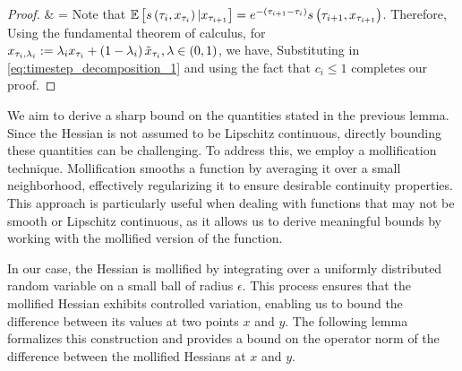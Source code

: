 \begin{proof}
{    & = 
    }
    Note that $\mathbb{E}\left[s\left(\tau_{i}, x_{\tau_i}\right)|x_{\tau_{i+1}}\right] = e^{-\left(\tau_{i+1}-\tau_{i}\right)}s\left(\tau_{i+1}, x_{\tau_{i+1}}\right)$. Therefore, 
    Using the fundamental theorem of calculus, for $x_{\tau_{i},\lambda_{i}} := \lambda_{i}x_{\tau_{i}} + \left(1-\lambda_{i}\right) \tilde{x}_{\tau_{i}}, \lambda \in \left(0,1\right)$, we have, 
    Substituting in \eqref{eq:timestep_decomposition_1} and using the fact that $c_i \leq 1$ completes our proof.
\end{proof}

We aim to derive a sharp bound on the quantities stated in the previous lemma. Since the Hessian is not assumed to be Lipschitz continuous, directly bounding these quantities can be challenging. To address this, we employ a mollification technique. Mollification smooths a function by averaging it over a small neighborhood, effectively regularizing it to ensure desirable continuity properties. This approach is particularly useful when dealing with functions that may not be smooth or Lipschitz continuous, as it allows us to derive meaningful bounds by working with the mollified version of the function.

In our case, the Hessian is mollified by integrating over a uniformly distributed random variable on a small ball of radius \(\epsilon\). This process ensures that the mollified Hessian exhibits controlled variation, enabling us to bound the difference between its values at two points \(x\) and \(y\). The following lemma formalizes this construction and provides a bound on the operator norm of the difference between the mollified Hessians at \(x\) and \(y\).


